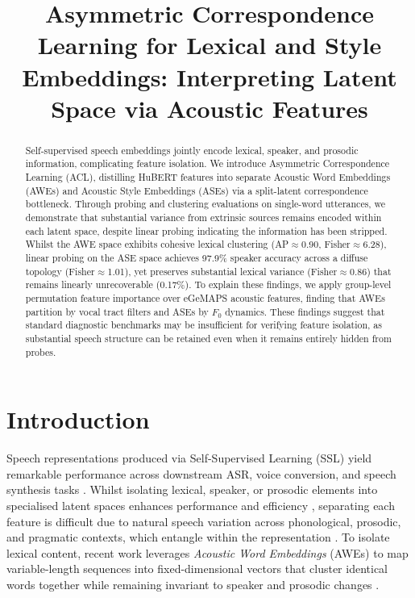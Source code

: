 \documentclass[conference,letterpaper]{IEEEtran}
\title{Asymmetric Correspondence Learning for Lexical and Style Embeddings: Interpreting Latent Space via Acoustic Features}
\author{
  \IEEEauthorblockN{Michael Whealing, Robert Gaizauskas, and Thomas Hain}
  \IEEEauthorblockA{\textit{School of Computer Science}, \textit{University of Sheffield} \\
  \{mwhealing1, r.gaizauskas, t.hain\}@sheffield.ac.uk}
}
\begin{document}
\maketitle
\thispagestyle{empty}

\begin{abstract}
    Self-supervised speech embeddings jointly encode lexical, speaker, and prosodic information, complicating feature isolation. We introduce Asymmetric Correspondence Learning (ACL), distilling HuBERT features into separate Acoustic Word Embeddings (AWEs) and Acoustic Style Embeddings (ASEs) via a split-latent correspondence bottleneck. Through probing and clustering evaluations on single-word utterances, we demonstrate that substantial variance from extrinsic sources remains encoded within each latent space, despite linear probing indicating the information has been stripped. Whilst the AWE space exhibits cohesive lexical clustering (AP$\approx$0.90, Fisher$\approx$6.28), linear probing on the ASE space achieves 97.9\% speaker accuracy across a diffuse topology (Fisher$\approx$1.01), yet preserves substantial lexical variance (Fisher$\approx$0.86) that remains linearly unrecoverable (0.17\%). To explain these findings, we apply group-level permutation feature importance over eGeMAPS acoustic features, finding that AWEs partition by vocal tract filters and ASEs by $F_0$ dynamics. These findings suggest that standard diagnostic benchmarks may be insufficient for verifying feature isolation, as substantial speech structure can be retained even when it remains entirely hidden from probes.
\end{abstract}


\section{Introduction}
Speech representations produced via Self-Supervised Learning (SSL) yield remarkable performance across downstream ASR, voice conversion, and speech synthesis tasks \cite{mohamed2022self}. Whilst isolating lexical, speaker, or prosodic elements into specialised latent spaces enhances performance and efficiency \cite{qu2023disentangling}, separating each feature is difficult due to natural speech variation across phonological, prosodic, and pragmatic contexts, which entangle within the representation \cite{jurafsky2003probabilistic}. To isolate lexical content, recent work leverages \textit{Acoustic Word Embeddings} (AWEs) to map variable-length sequences into fixed-dimensional vectors \cite{sanabria2023analyzing} that cluster identical words together \cite{meghanani-hain-2024-improving} while remaining invariant to speaker and prosodic changes \cite{lin2023selfsupervisedacousticwordembedding}.
\end{document}
